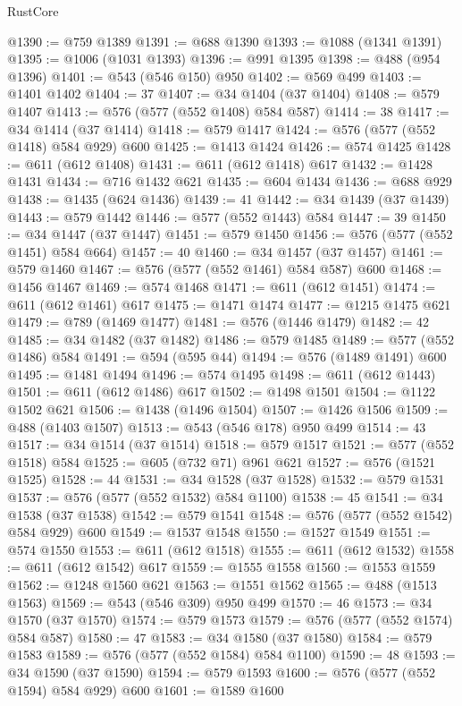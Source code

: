\begin{lexlean}{RustCore}
\begin{coremodule}
@1390 := @759 @1389
@1391 := @688 @1390
@1393 := @1088 (@1341 @1391)
@1395 := @1006 (@1031 @1393)
@1396 := @991 @1395
@1398 := @488 (@954 @1396)
@1401 := @543 (@546 @150) @950
@1402 := @569 @499
@1403 := @1401 @1402
@1404 := 37
@1407 := @34 @1404 (@37 @1404)
@1408 := @579 @1407
@1413 := @576 (@577 (@552 @1408) @584 @587)
@1414 := 38
@1417 := @34 @1414 (@37 @1414)
@1418 := @579 @1417
@1424 := @576 (@577 (@552 @1418) @584 @929) @600
@1425 := @1413 @1424
@1426 := @574 @1425
@1428 := @611 (@612 @1408)
@1431 := @611 (@612 @1418) @617
@1432 := @1428 @1431
@1434 := @716 @1432 @621
@1435 := @604 @1434
@1436 := @688 @929
@1438 := @1435 (@624 @1436)
@1439 := 41
@1442 := @34 @1439 (@37 @1439)
@1443 := @579 @1442
@1446 := @577 (@552 @1443) @584
@1447 := 39
@1450 := @34 @1447 (@37 @1447)
@1451 := @579 @1450
@1456 := @576 (@577 (@552 @1451) @584 @664)
@1457 := 40
@1460 := @34 @1457 (@37 @1457)
@1461 := @579 @1460
@1467 := @576 (@577 (@552 @1461) @584 @587) @600
@1468 := @1456 @1467
@1469 := @574 @1468
@1471 := @611 (@612 @1451)
@1474 := @611 (@612 @1461) @617
@1475 := @1471 @1474
@1477 := @1215 @1475 @621
@1479 := @789 (@1469 @1477)
@1481 := @576 (@1446 @1479)
@1482 := 42
@1485 := @34 @1482 (@37 @1482)
@1486 := @579 @1485
@1489 := @577 (@552 @1486) @584
@1491 := @594 (@595 @44)
@1494 := @576 (@1489 @1491) @600
@1495 := @1481 @1494
@1496 := @574 @1495
@1498 := @611 (@612 @1443)
@1501 := @611 (@612 @1486) @617
@1502 := @1498 @1501
@1504 := @1122 @1502 @621
@1506 := @1438 (@1496 @1504)
@1507 := @1426 @1506
@1509 := @488 (@1403 @1507)
@1513 := @543 (@546 @178) @950 @499
@1514 := 43
@1517 := @34 @1514 (@37 @1514)
@1518 := @579 @1517
@1521 := @577 (@552 @1518) @584
@1525 := @605 (@732 @71) @961 @621
@1527 := @576 (@1521 @1525)
@1528 := 44
@1531 := @34 @1528 (@37 @1528)
@1532 := @579 @1531
@1537 := @576 (@577 (@552 @1532) @584 @1100)
@1538 := 45
@1541 := @34 @1538 (@37 @1538)
@1542 := @579 @1541
@1548 := @576 (@577 (@552 @1542) @584 @929) @600
@1549 := @1537 @1548
@1550 := @1527 @1549
@1551 := @574 @1550
@1553 := @611 (@612 @1518)
@1555 := @611 (@612 @1532)
@1558 := @611 (@612 @1542) @617
@1559 := @1555 @1558
@1560 := @1553 @1559
@1562 := @1248 @1560 @621
@1563 := @1551 @1562
@1565 := @488 (@1513 @1563)
@1569 := @543 (@546 @309) @950 @499
@1570 := 46
@1573 := @34 @1570 (@37 @1570)
@1574 := @579 @1573
@1579 := @576 (@577 (@552 @1574) @584 @587)
@1580 := 47
@1583 := @34 @1580 (@37 @1580)
@1584 := @579 @1583
@1589 := @576 (@577 (@552 @1584) @584 @1100)
@1590 := 48
@1593 := @34 @1590 (@37 @1590)
@1594 := @579 @1593
@1600 := @576 (@577 (@552 @1594) @584 @929) @600
@1601 := @1589 @1600

\end{coremodule}
\end{lexlean}
